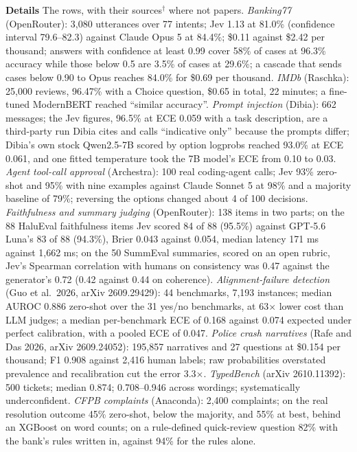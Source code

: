 \documentclass[11pt,letterpaper]{article}
\newcommand{\para}[1]{\medskip\noindent\textbf{#1}\quad}
\begin{document}
\para{Details} The rows, with their sources$^\dagger$ where not papers. \emph{Banking77} (OpenRouter): 3,080 utterances over 77 intents; Jev 1.13 at 81.0\% (confidence interval 79.6--82.3) against Claude Opus 5 at 84.4\%; \$0.11 against \$2.42 per thousand; answers with confidence at least 0.99 cover 58\% of cases at 96.3\% accuracy while those below 0.5 are 3.5\% of cases at 29.6\%; a cascade that sends cases below 0.90 to Opus reaches 84.0\% for \$0.69 per thousand. \emph{IMDb} (Raschka): 25,000 reviews, 96.47\% with a Choice question, \$0.65 in total, 22 minutes; a fine-tuned ModernBERT reached ``similar accuracy''. \emph{Prompt injection} (Dibia): 662 messages; the Jev figures, 96.5\% at ECE 0.059 with a task description, are a third-party run Dibia cites and calls ``indicative only'' because the prompts differ; Dibia's own stock Qwen2.5-7B scored by option logprobs reached 93.0\% at ECE 0.061, and one fitted temperature took the 7B model's ECE from 0.10 to 0.03. \emph{Agent tool-call approval} (Archestra): 100 real coding-agent calls; Jev 93\% zero-shot and 95\% with nine examples against Claude Sonnet 5 at 98\% and a majority baseline of 79\%; reversing the options changed about 4 of 100 decisions. \emph{Faithfulness and summary judging} (OpenRouter): 138 items in two parts; on the 88 HaluEval faithfulness items Jev scored 84 of 88 (95.5\%) against GPT-5.6 Luna's 83 of 88 (94.3\%), Brier 0.043 against 0.054, median latency 171 ms against 1,662 ms; on the 50 SummEval summaries, scored on an open rubric, Jev's Spearman correlation with humans on consistency was 0.47 against the generator's 0.72 (0.42 against 0.44 on coherence). \emph{Alignment-failure detection} (Guo et al.\ 2026, arXiv 2609.29429): 44 benchmarks, 7,193 instances; median AUROC 0.886 zero-shot over the 31 yes/no benchmarks, at 63$\times$ lower cost than LLM judges; a median per-benchmark ECE of 0.168 against 0.074 expected under perfect calibration, with a pooled ECE of 0.047. \emph{Police crash narratives} (Rafe and Das 2026, arXiv 2609.24052): 195,857 narratives and 27 questions at \$0.154 per thousand; F1 0.908 against 2,416 human labels; raw probabilities overstated prevalence and recalibration cut the error 3.3$\times$. \emph{TypedBench} (arXiv 2610.11392): 500 tickets; median 0.874; 0.708--0.946 across wordings; systematically underconfident. \emph{CFPB complaints} (Anaconda): 2,400 complaints; on the real resolution outcome 45\% zero-shot, below the majority, and 55\% at best, behind an XGBoost on word counts; on a rule-defined quick-review question 82\% with the bank's rules written in, against 94\% for the rules alone.
\end{document}
